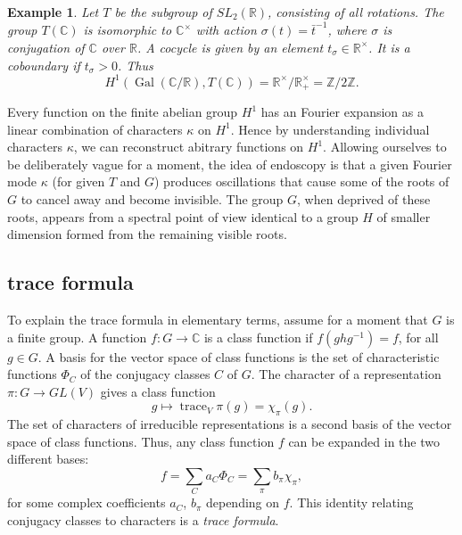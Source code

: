 \documentclass[brochure,english,12pt]{bourbaki}
\newtheorem{example}[equation]{Example}
\def\op#1{{\operatorname{#1}}}
\newcommand{\ring}[1]{\mathbb{#1}}
\begin{document}
\begin{example} Let $T$ be the subgroup of $SL_2(\ring{R})$,
  consisting of all rotations.  The group $T(\ring{C})$ is isomorphic
  to $\ring{C}^\times$ with action $\sigma(t) = \bar t^{-1}$, where
  $\sigma$ is conjugation of $\ring{C}$ over $\ring{R}$.  A cocycle is
  given by an element $t_\sigma\in\ring{R}^\times$.  It is a
  coboundary if $t_\sigma >0$.  Thus
\[
H^1(\op{Gal}(\ring{C}/\ring{R}),T(\ring{C})) = \ring{R}^\times/\ring{R}^\times_+ = \ring{Z}/2\ring{Z}.
\]
\end{example}

Every function on the finite abelian group $H^1$ has an Fourier
expansion as a linear combination of characters $\kappa$ on $H^1$.
Hence by understanding individual characters $\kappa$, we can
reconstruct abitrary functions on $H^1$.
Allowing ourselves to be deliberately vague for a moment, the idea of endoscopy
is that a given Fourier mode $\kappa$ (for given $T$ and $G$) produces
oscillations that cause some of the roots of $G$ to cancel away and
become invisible.  The group $G$, when deprived of these roots,
appears from a spectral point of view identical to a group $H$ of
smaller dimension formed from the remaining visible roots.


\subsection{trace formula}

To explain the trace formula in elementary terms, assume for a moment that
$G$ is a finite group.  A function  $f:G\to \ring{C}$ is a class function if
$f(g h g^{-1}) = f$, for all $g\in G$.  A basis for the vector space of class functions
is the set of characteristic functions $\Phi_C$ of the conjugacy classes $C$ of $G$. 
The character of a representation $\pi:G\to GL(V)$ gives a class function
\[
g \mapsto \op{trace}_V \pi(g) = \chi_\pi(g).
\]
The set of characters of irreducible representations is a second basis of the vector
space of class functions.  Thus, any class function $f$ can be expanded in the two different bases:
\[
f = \sum_C a_C \Phi_C = \sum_{\pi} b_\pi \chi_\pi,
\]
for some complex coefficients $a_C$, $b_\pi$ depending on $f$.
This identity relating conjugacy classes to characters is a {\it trace formula}.
\end{document}
